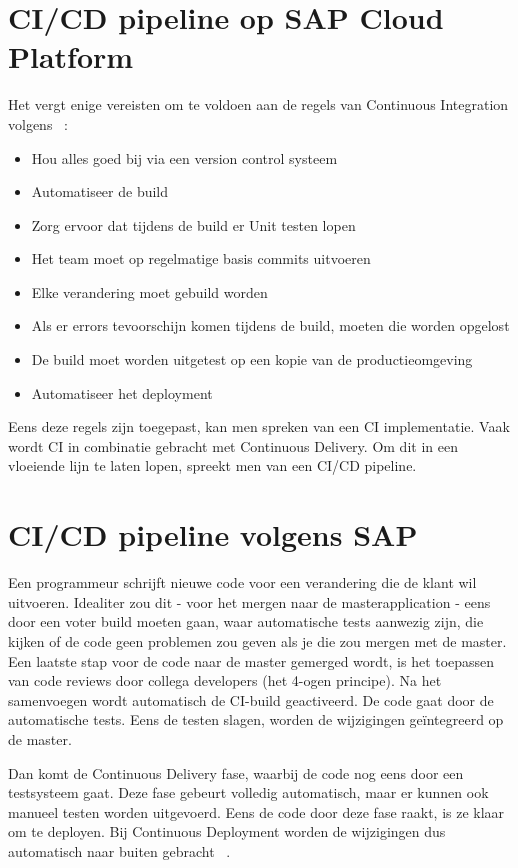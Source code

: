 \section{CI/CD pipeline op SAP Cloud Platform}
\label{sec:ci-cd-op-sap-cloud-platform}
Het vergt enige vereisten om te voldoen aan de regels van Continuous Integration volgens ~\textcite{Kramer2018}:
\begin{itemize}
    \item Hou alles goed bij via een version control systeem
    \item Automatiseer de build
    \item Zorg ervoor dat tijdens de build er Unit testen lopen
    \item Het team moet op regelmatige basis commits uitvoeren
    \item Elke verandering moet gebuild worden
    \item Als er errors tevoorschijn komen tijdens de build, moeten die worden opgelost
    \item De build moet worden uitgetest op een kopie van de productieomgeving
    \item Automatiseer het deployment
\end{itemize}
Eens deze regels zijn toegepast, kan men spreken van een CI implementatie.
Vaak wordt CI in combinatie gebracht met Continuous Delivery. Om dit in een vloeiende lijn te laten lopen, spreekt men van een CI/CD pipeline.

\section{CI/CD pipeline volgens SAP}
\label{sec:ci-cd-pipeling-volgens-sap}
Een programmeur schrijft nieuwe code voor een verandering die de klant wil uitvoeren. Idealiter zou dit - voor het mergen naar de masterapplication - eens door een voter build moeten gaan, waar automatische tests aanwezig zijn, die kijken of de code geen problemen zou geven als je die zou mergen met de master. Een laatste stap voor de code naar de master gemerged wordt, is het toepassen van code reviews door collega developers (het 4-ogen principe).
Na het samenvoegen wordt automatisch de CI-build geactiveerd. De code gaat door de automatische tests. Eens de testen slagen, worden de wijzigingen geïntegreerd op de master. 

Dan komt de Continuous Delivery fase, waarbij de code nog eens door een testsysteem gaat. Deze fase gebeurt volledig automatisch, maar er kunnen ook manueel testen worden uitgevoerd. Eens de code door deze fase raakt, is ze klaar om te deployen. 
Bij Continuous Deployment worden de wijzigingen dus automatisch naar buiten gebracht ~\autocite{Kramer2018}.

